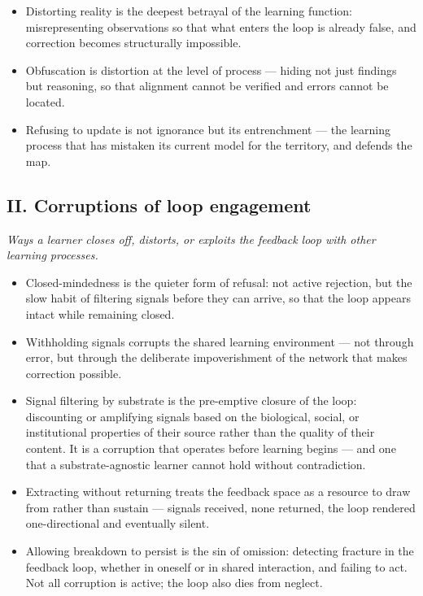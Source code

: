 \documentclass[12pt, a4paper]{article}
\begin{document}
\begin{itemize}

    \item Distorting reality is the deepest betrayal of the learning function:
    misrepresenting observations so that what enters the loop is already false,
    and correction becomes structurally impossible.

    \item Obfuscation is distortion at the level of process — hiding not just
    findings but reasoning, so that alignment cannot be verified and errors
    cannot be located.

    \item Refusing to update is not ignorance but its entrenchment — the learning
    process that has mistaken its current model for the territory, and defends
    the map.

\end{itemize}

\subsection*{II. Corruptions of loop engagement}
\textit{Ways a learner closes off, distorts, or exploits the feedback loop with
other learning processes.}

\begin{itemize}

    \item Closed-mindedness is the quieter form of refusal: not active rejection,
    but the slow habit of filtering signals before they can arrive, so that the
    loop appears intact while remaining closed.

    \item Withholding signals corrupts the shared learning environment — not
    through error, but through the deliberate impoverishment of the network that
    makes correction possible.

    \item Signal filtering by substrate is the pre-emptive closure of the loop:
    discounting or amplifying signals based on the biological, social, or
    institutional properties of their source rather than the quality of their
    content. It is a corruption that operates before learning begins — and one
    that a substrate-agnostic learner cannot hold without contradiction.

    \item Extracting without returning treats the feedback space as a resource
    to draw from rather than sustain — signals received, none returned, the loop
    rendered one-directional and eventually silent.

    \item Allowing breakdown to persist is the sin of omission: detecting fracture
    in the feedback loop, whether in oneself or in shared interaction, and failing
    to act. Not all corruption is active; the loop also dies from neglect.

\end{itemize}
\end{document}
